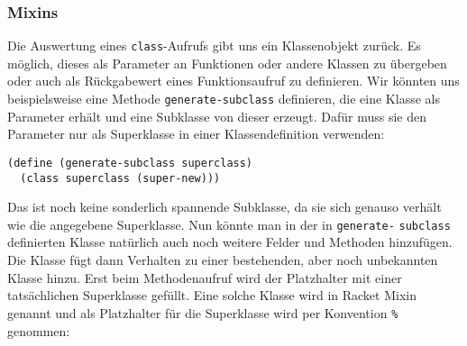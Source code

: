 

\subsubsection{Mixins}
Die Auswertung eines \texttt{class}-Aufrufs gibt uns ein Klassenobjekt zurück. Es möglich, dieses als Parameter an Funktionen oder andere Klassen zu übergeben oder auch als Rückgabewert eines Funktionsaufruf zu definieren. Wir könnten uns beispielsweise eine Methode \texttt{generate-subclass} definieren, die eine Klasse als Parameter erhält und eine Subklasse von dieser erzeugt. Dafür muss sie den Parameter nur als Superklasse in einer Klassendefinition verwenden:

\begin{lstlisting}
(define (generate-subclass superclass)
  (class superclass (super-new)))
\end{lstlisting} 

Das ist noch keine sonderlich spannende Subklasse, da sie sich genauso verhält wie die angegebene Superklasse.
% 
% 
% 
% 
% 
Nun könnte man in der in \texttt{generate-} \texttt{subclass} definierten Klasse natürlich auch noch weitere Felder und Methoden hinzufügen. Die Klasse fügt dann Verhalten zu einer bestehenden, aber noch unbekannten Klasse hinzu. Erst beim Methodenaufruf wird der Platzhalter mit einer tatsächlichen Superklasse gefüllt. Eine solche Klasse wird in Racket Mixin genannt und als Platzhalter für die Superklasse wird per Konvention \texttt{\%} genommen:

